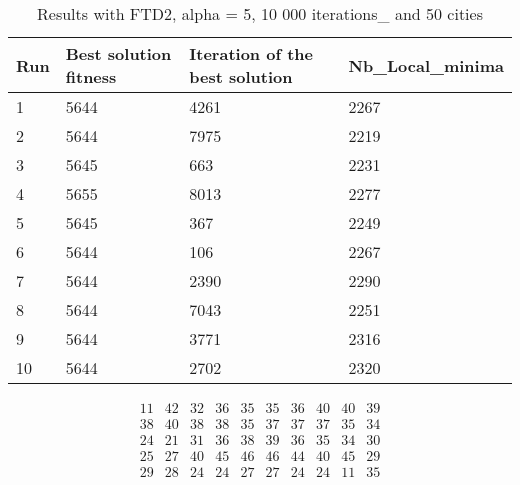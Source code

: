 \documentclass[12pt,oneside,a4paper]{article}
\begin{document}
\begin{table}[h]
  \centering
  \small
  \begin{tabular}{llll}
    \hline
    \multicolumn{1}{|l|}{\textbf{Run}}& \multicolumn{1}{l|}{\textbf{Best solution fitness}}& \multicolumn{1}{l|}{\textbf{Iteration of the best solution}}& \multicolumn{1}{l|}{\textbf{Nb\_Local\_minima}}\\ \hline
    \multicolumn{1}{|l|}{1} & \multicolumn{1}{l|}{5644}  & \multicolumn{1}{l|}{4261} & \multicolumn{1}{l|}{2267}  \\ \hline
    \multicolumn{1}{|l|}{2} & \multicolumn{1}{l|}{5644}  & \multicolumn{1}{l|}{7975} & \multicolumn{1}{l|}{2219}  \\ \hline
    \multicolumn{1}{|l|}{3} & \multicolumn{1}{l|}{5645}  & \multicolumn{1}{l|}{663}  & \multicolumn{1}{l|}{2231}  \\ \hline
    \multicolumn{1}{|l|}{4} & \multicolumn{1}{l|}{5655}  & \multicolumn{1}{l|}{8013}  & \multicolumn{1}{l|}{2277}  \\ \hline
    \multicolumn{1}{|l|}{5} & \multicolumn{1}{l|}{5645}  & \multicolumn{1}{l|}{367}  & \multicolumn{1}{l|}{2249}  \\ \hline
    \multicolumn{1}{|l|}{6} & \multicolumn{1}{l|}{5644}  & \multicolumn{1}{l|}{106}  & \multicolumn{1}{l|}{2267}  \\ \hline
    \multicolumn{1}{|l|}{7} & \multicolumn{1}{l|}{5644}  & \multicolumn{1}{l|}{2390}  & \multicolumn{1}{l|}{2290}  \\ \hline
    \multicolumn{1}{|l|}{8} & \multicolumn{1}{l|}{5644}  & \multicolumn{1}{l|}{7043} & \multicolumn{1}{l|}{2251}  \\ \hline
    \multicolumn{1}{|l|}{9} & \multicolumn{1}{l|}{5644}  & \multicolumn{1}{l|}{3771} & \multicolumn{1}{l|}{2316}  \\ \hline
    \multicolumn{1}{|l|}{10} & \multicolumn{1}{l|}{5644}  & \multicolumn{1}{l|}{2702} & \multicolumn{1}{l|}{2320}  \\ \hline
  \end{tabular}
  \caption{Results with FTD2, alpha = 5, 10 000 iterations\_ and 50 cities}
\end{table}


\begin{equation}
  \tag{Mean Tabu Duration by city table 17}
  \begin{smallmatrix} 11 & 42 & 32 & 36 & 35 & 35 & 36 & 40 & 40 & 39\\
    38 & 40 & 38 & 38 & 35 & 37 & 37 & 37 & 35 & 34 \\ 
    24 & 21 & 31 & 36 & 38& 39 & 36 & 35 & 34 & 30 \\
    25 & 27 & 40  &45 & 46 & 46 & 44 & 40 & 45 & 29 \\
    29 & 28 & 24 & 24 & 27 & 27 & 24 & 24 & 11 & 35 \\
  \end{smallmatrix}
\end{equation}
\end{document}

